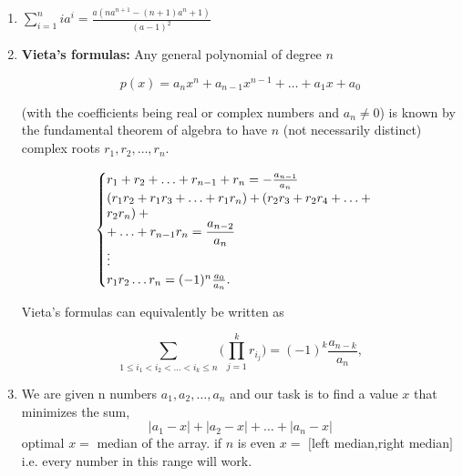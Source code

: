 \begin{enumerate}
\item $\displaystyle \sum_{i = 1}^n{ia^i} = \frac{a(n a^{n + 1} - (n + 1) a^n + 1)}{(a - 1)^2}$
\item \textbf{Vieta's formulas:}
    Any general polynomial of degree $n$
    
    $$\displaystyle p(x) = a_nx^n + a_{n - 1}x^{n - 1} +  \ldots  + a_1x + a_0$$

    (with the coefficients being real or complex numbers and $\displaystyle a_n \neq 0$) is known by the fundamental theorem of algebra to have $n$ (not necessarily distinct) complex roots $r_1, r_2, \ldots , r_n$.
    
    $$
        \begin{cases}
        \text{$r_1 + r_2 +  \ldots  + r_{n - 1} + r_n = - \frac{a_{n - 1}}{a_n}$}
        \\
        \parbox[t]{.6\textwidth}{$\displaystyle (r_1r_2 + r_1r_3 +  \ldots  + r_1r_n) + (r_2r_3 + r_2r_4 +  \ldots  + r_2r_n) +\\+  \ldots  + r_{n - 1}r_n = \frac{a_{n - 2}}{a_n}$}
        \\\vdots\\
        \text{$r_1r_2 \ldots r_n = (-1)^n\frac{a_0}{a_n}.$}
        \end{cases}       
    $$  

    Vieta's formulas can equivalently be written as
    
    $$\displaystyle \sum_{1 \leq i_1 < i_2 <  \ldots <i_k \leq n} \Bigg(\prod_{j = 1}^k{r_{i_j}}\Bigg) = (-1)^k\frac{a_{n - k}}{a_n},$$

\item We are given n numbers $\displaystyle a_1,a_2, \ldots ,a_n$ and our task is to find a value $\displaystyle x$ that minimizes the sum, 
    $$|a_1 - x| + |a_2 - x| +  \ldots  + |a_n - x|$$  
    optimal $\displaystyle x=$ median of the array.  
    if $n$ is even $\displaystyle x =$ $[$left median,right median$]$ i.e. every number in this range will work.


\end{enumerate}

